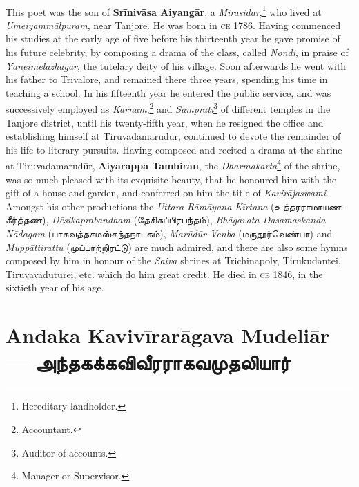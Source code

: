 \documentclass{article}
\newcommand{\TamilText}[1]{\texttamil{#1}}
\newcommand{\TamilBold}[1]{\texttamil{\textbf{#1}}}
\newcommand{\tam}[1]{\TamilText{#1}}
\newcommand{\tambold}[1]{\TamilBold{#1}}
\begin{document}
\paragraph{}
This poet was the son of \textbf{Sr\={i}niv\={a}sa Aiyang\={a}r}, a \emph{Mirasidar},\footnote{Hereditary landholder.} who lived at \emph{Umeiyamm\={a}lpuram}, near Tanjore. He was born in \textsc{ce} 1786. Having commenced his studies at the early age of five before his thirteenth year he gave promise of his future celebrity, by composing a drama of the class, called \emph{Nondi}, in praise of \emph{Y\={a}neimelazhagar}, the tutelary deity of his village. Soon afterwards he went with his father to Trivalore, and remained there three years, spending his time in teaching a school. In his fifteenth year he entered the public service, and was successively employed as \emph{Karnam},\footnote{Accountant.} and \emph{Samprati}\footnote{Auditor of accounts.} of different temples in the Tanjore district, until his twenty-fifth year, when he resigned the office and establishing himself at Tiruvadamarud\={u}r, continued to devote the remainder of his life to literary pursuits. Having composed and recited a drama at the shrine at Tiruvadamarud\={u}r, \textbf{Aiy\={a}rappa Tambir\={a}n}, the \emph{Dharmakarta}\footnote{Manager or Supervisor.} of the shrine, was so much pleased with its exquisite beauty, that he honoured him with the gift of a house and garden, and conferred on him the title of \emph{Kavir\={a}jaswami}. Amongst his other productions the \emph{Uttara R\={a}m\={a}yana K\={i}rtana} (\tam{உத்தரராமாயணகீர்த்தண}), \emph{D\={e}sikaprabandham} (\tam{தேசிகப்பிரபந்தம்}), \emph{Bh\={a}gavata Dasamaskanda N\={a}dagam} (\tam{பாகவத்தசமஸ்கந்தநாடகம்}), \emph{Mar\={u}d\={u}r Venba} (\tam{மருதூர்வெண்பா}) and \emph{Mupp\={a}ttirattu} (\tam{முப்பாற்றிரட்டு}) are much admired, and there are also some hymns composed by him in honour of the \emph{Saiva} shrines at Trichinapoly, Tirukudantei, Tiruvavaduturei, etc. which do him great credit. He died in \textsc{ce} 1846, in the sixtieth year of his age.

\section{Andaka Kaviv\={i}rar\={a}gava Mudeli\={a}r --- \tambold{அந்தகக்கவிவீரராகவமுதலியார்}}
\end{document}
